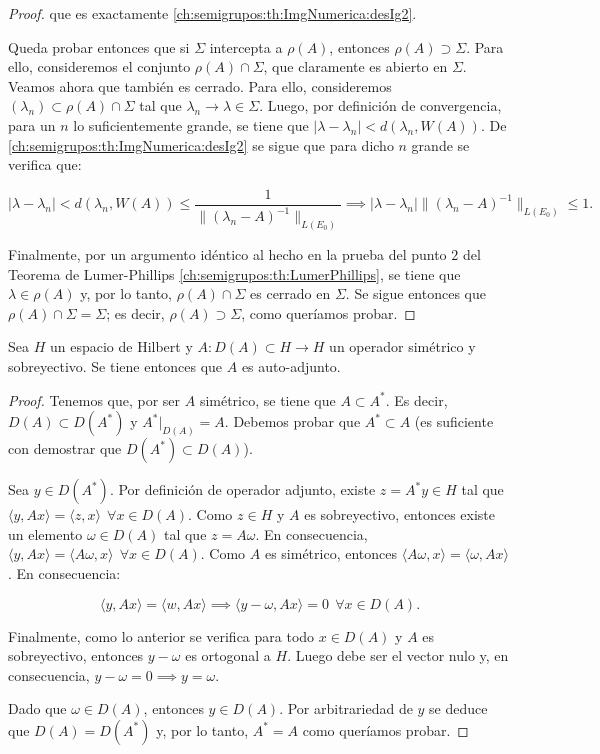 \begin{proof}
    que es exactamente \ref{ch:semigrupos:th:ImgNumerica:desIg2}.

    Queda probar entonces que si $\Sigma$ intercepta a $\rho(A)$, entonces $\rho(A) \supset \Sigma$. Para ello, consideremos el conjunto $\rho(A) \cap \Sigma$, que claramente es abierto en $\Sigma$. Veamos ahora que también es cerrado. Para ello, consideremos $(\lambda_n) \subset \rho(A) \cap \Sigma$ tal que $\lambda_n \rightarrow \lambda \in \Sigma$. Luego, por definición de convergencia, para un $n$ lo suficientemente grande, se tiene que $|\lambda - \lambda_n | < d(\lambda_n, W(A))$. De \ref{ch:semigrupos:th:ImgNumerica:desIg2} se sigue que para dicho $n$ grande se verifica que:

    \[|\lambda - \lambda_n| < d(\lambda_n, W(A)) \leq  \frac{1}{\lVert(\lambda_n -A)^{-1} \rVert_{L(E_0)}} \implies |\lambda - \lambda_n| \lVert(\lambda_n -A)^{-1} \rVert_{L(E_0)} \leq 1.\]

    Finalmente, por un argumento idéntico al hecho en la prueba del punto $2$ del Teorema de Lumer-Phillips \ref{ch:semigrupos:th:LumerPhillips}, se tiene que $\lambda \in \rho(A)$ y, por lo tanto, $\rho(A) \cap \Sigma$ es cerrado en $\Sigma$. Se sigue entonces que $\rho(A) \cap \Sigma = \Sigma$; es decir, $\rho(A) \supset \Sigma$, como queríamos probar.
\end{proof}


\begin{Proposicion}
    \label{ch:semigrupos:prop:simetricoSobreyectivoAutoadjunto}
    Sea $H$ un espacio de Hilbert y $A : D(A) \subset H \rightarrow H$ un operador simétrico y sobreyectivo. Se tiene entonces que $A$ es auto-adjunto.
\end{Proposicion}

\begin{proof}
    Tenemos que, por ser $A$ simétrico, se tiene que $A \subset A^*$. Es decir, $D(A) \subset D(A^*)$ y $A^*|_{D(A)} =A$. Debemos probar que $A^* \subset A$ (es suficiente con demostrar que $D(A^*) \subset D(A)$).

    Sea $y \in D(A^*)$. Por definición de operador adjunto, existe $z = A^*y \in H$ tal que $\langle y , Ax\rangle = \langle z ,x \rangle \ \ \forall x \in D(A)$. Como $z \in H$ y $A$ es sobreyectivo, entonces existe un elemento $\omega \in D(A)$ tal que $z = A\omega$. En consecuencia, $\langle y, Ax\rangle = \langle A \omega, x \rangle \ \ \forall x \in D(A)$. Como $A$ es simétrico, entonces $\langle A \omega, x \rangle = \langle \omega, Ax \rangle$. En consecuencia:

    \[\langle y ,Ax \rangle = \langle w, Ax\rangle \implies \langle y - \omega, Ax \rangle = 0 \ \ \forall x \in D(A).\]

    Finalmente, como lo anterior se verifica para todo $x \in D(A)$ y $A$ es sobreyectivo, entonces $y - \omega$ es ortogonal a $H$. Luego debe ser el vector nulo y, en consecuencia, $y - \omega = 0 \implies y = \omega$.

    Dado que $\omega \in D(A)$, entonces $y \in D(A)$. Por arbitrariedad de $y$ se deduce que $D(A) = D(A^*)$ y, por lo tanto, $A^* = A$ como queríamos probar.
\end{proof}

